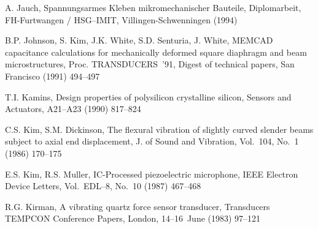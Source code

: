 \begin{thebibliography}{xxx}

 A. Jauch, Spannungsarmes Kleben mikromechanischer Bauteile, Diplomarbeit,
 FH-Furtwangen / HSG--IMIT, Villingen-Schwenningen (1994)

 B.P. Johnson, S. Kim, J.K. White, S.D. Senturia, J. White, {\sf MEMCAD}
 capacitance calculations for mechanically deformed square diaphragm and
 beam microstructures, Proc. TRANSDUCERS~'91, Digest of technical papers,
 San Francisco (1991) 494--497




 T.I. Kamins, Design properties of polysilicon crystalline silicon,
 Sensors and Actuators, A21--A23 (1990) 817--824


 C.S. Kim, S.M. Dickinson, The flexural vibration of slightly curved slender
 beams subject to axial end displacement, J. of Sound and Vibration,
 Vol.~104, No.~1 (1986) 170--175

 E.S. Kim, R.S. Muller, IC-Processed piezoelectric microphone, IEEE Electron
 Device Letters, Vol.~EDL--8, No.~10 (1987) 467--468

 R.G. Kirman, A vibrating quartz force sensor transducer, Transducers
 TEMPCON Conference Papers, London, 14--16~June (1983) 97--121


\end{thebibliography}
